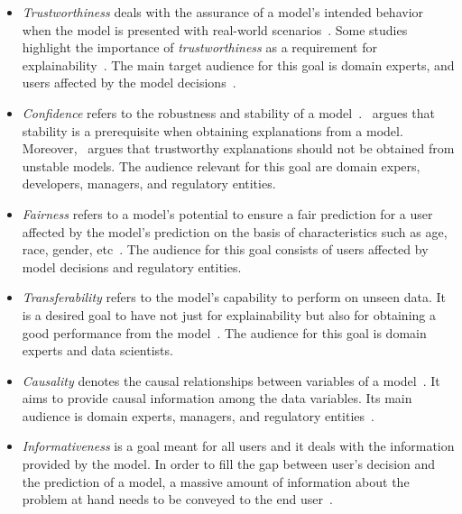 \begin{itemize}
    \item \emph{Trustworthiness} deals with the assurance of a model's intended behavior when the model is presented with real-world scenarios~\parencite{TheMythosOfModelInterpretability_Lipton, StructuringDimensionsForCollaborative_Antunes}. Some studies highlight the importance of \emph{trustworthiness} as a requirement for explainability~\parencite{WhyShouldITrustYou_Riberio, InteractiveBayesianCaseModel_Kim}. The main target audience for this goal is domain experts, and users affected by the model decisions~\parencite{XAIConceptsTaxonomies_Arrieta}.
    \item \emph{Confidence} refers to the robustness and stability of a model~\parencite{XAIConceptsTaxonomies_Arrieta}.~\cite{Stability_Yu} argues that stability is a prerequisite when obtaining explanations from a model. Moreover,~\parencite{XAIConceptsTaxonomies_Arrieta} argues that trustworthy explanations should not be obtained from unstable models. The audience relevant for this goal are domain expers, developers, managers, and regulatory entities.
    \item \emph{Fairness} refers to a model's potential to ensure a fair prediction for a user affected by the model's prediction on the basis of characteristics such as age, race, gender, etc~\parencite{XAIConceptsTaxonomies_Arrieta, FairnessInML_Oneto}. The audience for this goal consists of users affected by model decisions and regulatory entities.
    \item \emph{Transferability} refers to the model's capability to perform on unseen data. It is a desired goal to have not just for explainability but also for obtaining a good performance from the model~\parencite{AppliedPredictiveModeling_Kuhn}. The audience for this goal is domain experts and data scientists.
    \item \emph{Causality} denotes the causal relationships between variables of a model~\parencite{Causality_Pearl}. It aims to provide causal information among the data variables. Its main audience is domain experts, managers, and regulatory entities~\parencite{XAIConceptsTaxonomies_Arrieta}.
    \item \emph{Informativeness} is a goal meant for all users and it deals with the information provided by the model. In order to fill the gap between user's decision and the prediction of a model, a massive amount of information about the problem at hand needs to be conveyed to the end user~\parencite{XAIConceptsTaxonomies_Arrieta}.

\end{itemize}
